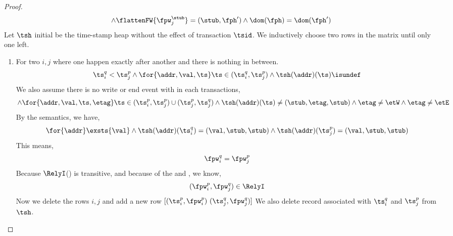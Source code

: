 \begin{proof}
\[    \land \flattenFW{\fpw_{j}^{\stub}} = (\stub, \fph')
    \land \dom(\fph) = \dom(\fph')
\]
Let \( \tsh \) initial be the time-stamp heap without the effect of transaction \( \tsid \).
We inductively choose two rows in the matrix until only one left.
\begin{enumerate}
\item For two \( i,j \) where one happen exactly after another and there is nothing in between.
\[
\ts_{i}^{q} < \ts_{j}^{p}
\land \for{\addr,\val, \ts}                             
\ts \in (\ts_{i}^{q}, \ts_{j}^{p} ) 
\land \tsh(\addr)(\ts)\isundef
\]
We also assume there is no write or end event with in each transactions,
\[
\land \for{\addr,\val, \ts, \etag}                             
\ts \in (\ts_{i}^{p}, \ts_{j}^{p} )  \cup (\ts_{j}^{p}, \ts_{j}^{q})
\land \tsh(\addr)(\ts) \neq (\stub, \etag, \stub)
\land \etag \neq \etW
\land \etag \neq \etE
\]
By the semantics, we  have,
\[
\for{\addr} \exsts{\val} 
\land \tsh(\addr)(\ts_{i}^{q}) = (\val, \stub, \stub)
\land \tsh(\addr)(\ts_{j}^{p}) = (\val, \stub, \stub)
\]
This means,
\[
    \fpw_{i}^{q} = \fpw_{j}^{p}
\]
Because \( \RelyI \)() is transitive, and because of the \ih and , we know,
\[
    (\fpw_{i}^{p}, \fpw_{j}^{q}) \in \RelyI
\]
Now we delete the rows \( i,j \) and add a new row \( [ (\ts_{i}^{p}, \fpw_{i}^{p}) \  (\ts_{j}^{q}, \fpw_{j}^{q}) ] \)
We also delete record associated with \( \ts_{i}^{q} \) and \( \ts_{j}^{p} \) from \( \tsh \).


\end{enumerate}
\end{proof}
